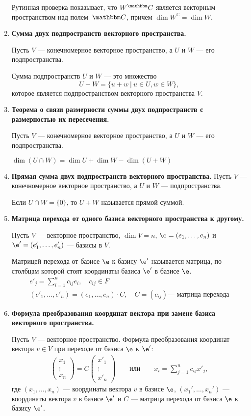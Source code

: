 \begin{enumerate}
Рутинная проверка показывает, что $W^\C$ является векторным пространством над полем~$\C$, причем $\dim W^\mathbb{C} = \dim W$.

\item \textbf{Сумма двух подпространств векторного пространства.}

Пусть $V$ --- конечномерное векторное пространство, а $U$ и $W$ --- его подпространства.

Сумма подпространств $U$ и $W$ --- это множество
\[
U+W = \{u + w\ |\ u \in U, w \in W\},
\]
которое является подпространством векторного пространства $V$.

\item \textbf{Теорема о связи размерности суммы двух подпространств с размерностью их пересечения.}

Пусть $V$ --- конечномерное векторное пространство, а $U$ и $W$ --- его подпространства.

$\dim \left(U \cap W\right) = \dim U + \dim W - \dim \left(U+W\right)$

\item \textbf{Прямая сумма двух подпространств векторного пространства.}
Пусть $V$ --- конечномерное векторное пространство, а $U$ и $W$ --- подпространства.

Если $U \cap W = \{0\}$, то $U + W$ называется прямой суммой.

\item \textbf{Матрица перехода от одного базиса векторного пространства к другому.}

Пусть $V$ --- векторное пространство, $\dim V = n$, $\e = (e_1, \ldots, e_n)$ и $\e' =(e_1', \ldots, e_n')$ --- базисы в $V$.

Матрицей перехода от базисе $\e$ к базису $\e'$ называется матрица, по столбцам которой стоят координаты базиса $\e'$ в базисе $\e$.
\begin{gather*}
e'_j = \sum_{i = 1}^{n} c_{ij}e_i, \quad c_{ij} \in F \\
(e'_1, \ldots, e'_n) = (e_1, \ldots, e_n) \cdot C, \quad C = (c_{ij}) \text{--- матрица перехода}
\end{gather*}

\item \textbf{Формула преобразования координат вектора при замене базиса векторного пространства.}

Пусть $V$ --- векторное пространство. Формула преобразования координат вектора $v \in V$ при переходе от базиса $\e$ к $\e'$:
\begin{gather*}
\begin{pmatrix*}
x_1 \\
\vdots \\
x_n
\end{pmatrix*}
= C 
\begin{pmatrix*}
x'_1 \\
\vdots \\
x'_n
\end{pmatrix*}
\qquad \text{или} \qquad
x_i = \sum_{j = 1}^{n}c_{ij}x'_j,
\end{gather*}
где $(x_1, \ldots, x_n)$ --- координаты вектора $v$ в базисе $\e $, $(x_1', \ldots, x_n')$ --- координаты вектора $v$  в базисе $\e '$ и $C$ --- матрица перехода от базиса $\e $ к базису $\e '$.


\end{enumerate}
